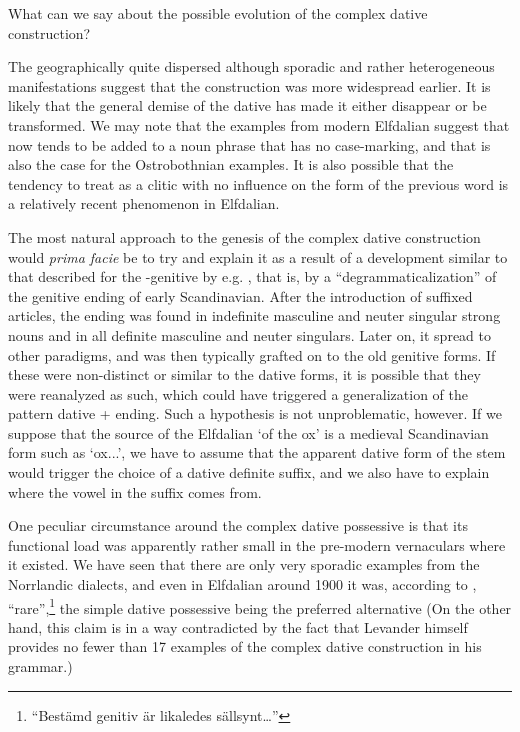 What can we say about the possible evolution of the complex dative construction? 

The geographically quite dispersed although sporadic and rather heterogeneous manifestations suggest that the construction was more widespread earlier. It is likely that the general demise of the dative has made it either disappear or be transformed. We may note that the examples from modern Elfdalian suggest that now tends to be added to a noun phrase that has no case-marking, and that is also the case for the Ostrobothnian examples. It is also possible that the tendency to treat  as a clitic with no influence on the form of the previous word is a relatively recent phenomenon in Elfdalian.  

The most natural approach to the genesis of the complex dative construction would \textit{prima facie} be to try and explain it as a result of a development similar to that described for the -genitive by e.g. \citet{Norde1997}, that is, by a “degrammaticalization” of the genitive ending of early Scandinavian. After the introduction of suffixed articles, the ending was found in indefinite masculine and neuter singular strong nouns and in all definite masculine and neuter singulars. Later on, it spread to other paradigms, and was then typically grafted on to the old genitive forms. If these were non-distinct or similar to the dative forms, it is possible that they were reanalyzed as such, which could have triggered a generalization of the pattern dative + ending. Such a hypothesis is not unproblematic, however. If we suppose that the source of the Elfdalian  ‘of the ox’ is a medieval Scandinavian form such as  ‘ox.{}.{\gen}.{\sg}’, we have to assume that the apparent dative form of the stem would trigger the choice of a dative definite suffix, and we also have to explain where the vowel in the suffix comes from. 

One peculiar circumstance around the complex dative possessive is that its functional load was apparently rather small in the pre-modern vernaculars where it existed. We have seen that there are only very sporadic examples from the Norrlandic dialects, and even in Elfdalian around 1900 it was, according to \citet[98-99]{Levander1909}, “rare”,\footnote{ “Bestämd genitiv är likaledes sällsynt…”} the simple dative possessive being the preferred alternative (On the other hand, this claim is in a way contradicted by the fact that Levander himself provides no fewer than 17 examples of the complex dative construction in his grammar.) 

